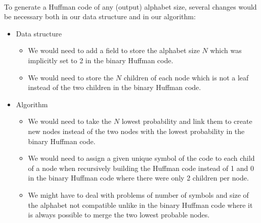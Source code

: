 \documentclass[a4paper, 11pt, oneside]{article}
\begin{document}
\paragraph{}To generate a Huffman code of any (output) alphabet size, several changes would be necessary both in our data structure and in our algorithm:
\begin{itemize}
    \item Data structure
        \begin{itemize}
            \item We would need to add a field to store the alphabet size $N$ which was implicitly set to 2 in the binary Huffman code.
            \item We would need to store the $N$ children of each node which is not a leaf instead of the two children in the binary Huffman code.
        \end{itemize}
    \item Algorithm
        \begin{itemize}
            \item We would need to take the $N$ lowest probability and link them to create new nodes instead of the two nodes with the lowest probability in the binary Huffman code.
            \item We would need to assign a given unique symbol of the code to each child of a node when recursively building the Huffman code instead of 1 and 0 in the binary Huffman code where there were only 2 children per node.
            \item We might have to deal with problems of number of symbols and size of the alphabet not compatible unlike in the binary Huffman code where it is always possible to merge the two lowest probable nodes. 
        \end{itemize}
\end{itemize}
\end{document}

